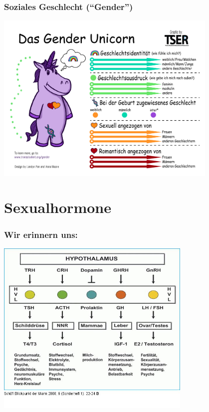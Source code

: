 \documentclass{beamer}
\begin{document}
\begin{frame}
\frametitle{Soziales Geschlecht (``Gender'')}

\begin{center}
  \includegraphics[width=0.8\textwidth]{genderunicorn.jpg}
\end{center}


\end{frame}




\section{Sexualhormone}


\begin{frame}
\frametitle{Wir erinnern uns:}
\begin{center}
  \includegraphics[width=0.7\textwidth]{hypothalamus_hypophyse_gewebe.jpg}
\end{center}
\end{frame}
\end{document}
